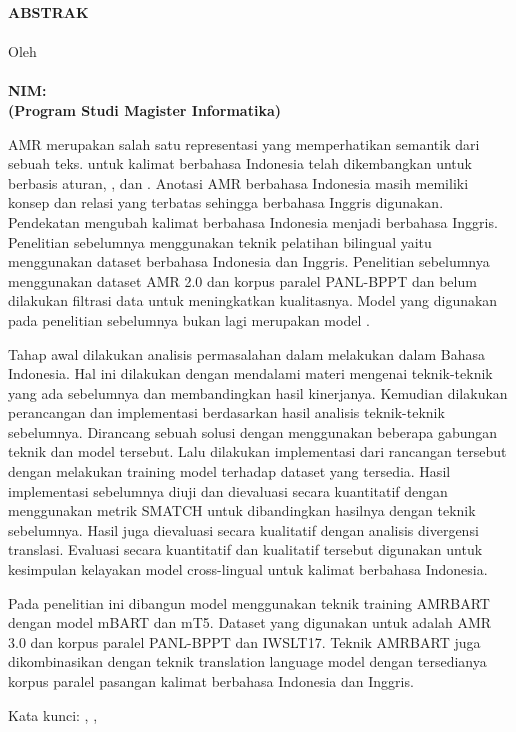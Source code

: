 \clearpage
{}

\begin{spacing}{1}
\begin{center}
  \textbf{\large \MakeUppercase{Abstrak}} \\[2em]

  \textbf{\large \MakeUppercase{\Title}} \\[2em]

  \normalsize \normalfont Oleh\\
  \large \bfseries \AuthorName\\
  NIM:~\uppercase{\AuthorNIM}\\
  (Program Studi Magister Informatika)\\[3em]
\end{center}

\Gls{AMR} merupakan salah satu representasi yang memperhatikan semantik dari sebuah teks.
\amrparsing{} untuk kalimat berbahasa Indonesia telah dikembangkan untuk  berbasis aturan, , dan \crosslingual{}.
Anotasi AMR berbahasa Indonesia masih memiliki konsep dan relasi yang terbatas sehingga \AMR{} berbahasa Inggris digunakan.
Pendekatan \crosslingual{} mengubah kalimat berbahasa Indonesia menjadi \AMR{} berbahasa Inggris.
Penelitian sebelumnya menggunakan teknik pelatihan bilingual yaitu menggunakan dataset berbahasa Indonesia dan Inggris.
Penelitian sebelumnya menggunakan dataset AMR 2.0 dan korpus paralel PANL-BPPT dan belum dilakukan filtrasi data untuk meningkatkan kualitasnya.
Model yang digunakan pada penelitian sebelumnya bukan lagi merupakan model \sota{}.

Tahap awal dilakukan analisis permasalahan dalam melakukan \amrparsing{} dalam Bahasa Indonesia.
Hal ini dilakukan dengan mendalami materi mengenai teknik-teknik \amrparsing{} yang ada sebelumnya dan membandingkan hasil kinerjanya.
Kemudian dilakukan perancangan dan implementasi berdasarkan hasil analisis teknik-teknik \amrparsing{} sebelumnya.
Dirancang sebuah solusi dengan menggunakan beberapa gabungan teknik dan model tersebut.
Lalu dilakukan implementasi dari rancangan tersebut dengan melakukan training model terhadap dataset yang tersedia.
Hasil implementasi sebelumnya diuji dan dievaluasi secara kuantitatif dengan menggunakan metrik SMATCH untuk dibandingkan hasilnya dengan teknik sebelumnya.
Hasil \amrparsing{} juga dievaluasi secara kualitatif dengan analisis divergensi translasi.
Evaluasi secara kuantitatif dan kualitatif tersebut digunakan untuk kesimpulan kelayakan model \amrparsing{} cross-lingual untuk kalimat berbahasa Indonesia.

Pada penelitian ini dibangun model \amrparsing{} \crosslingual{} menggunakan teknik training AMRBART dengan model mBART dan mT5.
Dataset yang digunakan untuk  adalah AMR 3.0 dan korpus paralel PANL-BPPT dan IWSLT17.
Teknik  AMRBART juga dikombinasikan dengan teknik  translation language model dengan tersedianya korpus paralel pasangan kalimat berbahasa Indonesia dan Inggris.

\noindent Kata kunci: , \crosslingual{}, 
\end{spacing}
